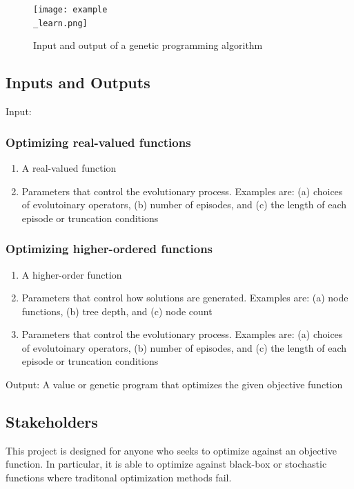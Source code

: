 \documentclass{article}
\begin{document}
\begin{figure}[h]
    \caption{Input and output of a genetic programming algorithm}
    \texttt{[image: example\\\_learn.png]}
    \centering
\end{figure}

\subsection{Inputs and Outputs}

Input: 
\subsubsection{Optimizing real-valued functions}
\begin{enumerate}
    \item A real-valued function
    \item Parameters that control the evolutionary process. Examples are: (a) choices of evolutoinary operators, (b) number of episodes, and (c) the length of each episode or truncation conditions
\end{enumerate}

\subsubsection{Optimizing higher-ordered functions}
\begin{enumerate}
    \item A higher-order function
    \item Parameters that control how solutions are generated. Examples are: (a) node functions, (b) tree depth, and (c) node count
    \item Parameters that control the evolutionary process. Examples are: (a) choices of evolutoinary operators, (b) number of episodes, and (c) the length of each episode or truncation conditions
\end{enumerate}


Output: A value or genetic program that optimizes the given objective function


\subsection{Stakeholders}
This project is designed for anyone who seeks to optimize against an objective function. In particular, it is able to optimize against black-box or stochastic functions where traditonal optimization methods fail.
\end{document}
